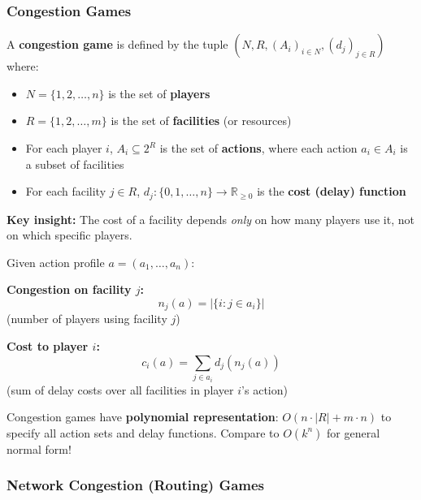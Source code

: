 \bigseparator

\subsubsection{Congestion Games}

\begin{defbox}
A \textbf{congestion game} is defined by the tuple $(N, R, (A_i)_{i \in N}, (d_j)_{j \in R})$ where:

\begin{itemize}
  \item $N = \{1, 2, \ldots, n\}$ is the set of \textbf{players}
  \item $R = \{1, 2, \ldots, m\}$ is the set of \textbf{facilities} (or resources)
  \item For each player $i$, $A_i \subseteq 2^R$ is the set of \textbf{actions}, where each action $a_i \in A_i$ is a subset of facilities
  \item For each facility $j \in R$, $d_j : \{0, 1, \ldots, n\} \to \mathbb{R}_{\geq 0}$ is the \textbf{cost (delay) function}
\end{itemize}

\textbf{Key insight:} The cost of a facility depends \textit{only} on how many players use it, not on which specific players.
\end{defbox}

\begin{defbox}
Given action profile $a = (a_1, \ldots, a_n)$:

\textbf{Congestion on facility $j$:}
\[
n_j(a) = |\{i : j \in a_i\}|
\]
(number of players using facility $j$)

\textbf{Cost to player $i$:}
\[
c_i(a) = \sum_{j \in a_i} d_j(n_j(a))
\]
(sum of delay costs over all facilities in player $i$'s action)
\end{defbox}

\begin{tipbox}
Congestion games have \textbf{polynomial representation}: $O(n \cdot |R| + m \cdot n)$ to specify all action sets and delay functions. Compare to $O(k^n)$ for general normal form!
\end{tipbox}

\separator

\subsubsection{Network Congestion (Routing) Games}


